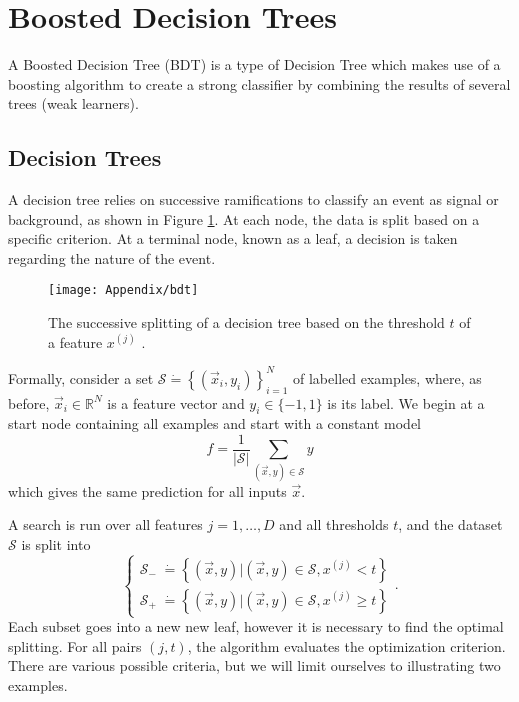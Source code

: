 \documentclass[10pt,a4paper]{book}
\begin{document}
\section{Boosted Decision Trees}
A Boosted Decision Tree (BDT) is a type of Decision Tree which makes use of a boosting algorithm to create a strong classifier by combining the results of several trees (weak learners). 

\subsection{Decision Trees}
A decision tree relies on successive ramifications to classify an event as signal or background, as shown in Figure \ref{tree}. At each node, the data is split based on a specific criterion. At a terminal node, known as a leaf, a decision is taken regarding the nature of the event.

\begin{figure}
\centering
\texttt{[image: Appendix/bdt]}
\caption{The successive splitting of a decision tree based on the threshold $t$ of a feature $x^{(j)}$ \cite{tree_image}.}
\label{tree}
\end{figure}

Formally, consider a set $\mathcal{S} \dot{=} \left\lbrace (\vec{x}_i, y_i) \right\rbrace_{i = 1}^N$ of labelled examples, where, as before, $\vec{x}_i \in \mathbb{R}^N$ is a feature vector and $y_i \in \lbrace -1, 1 \rbrace$ is its label. We begin at a start node containing all examples and start with a constant model
\begin{equation}
f = \frac{1}{\vert \mathcal{S} \vert} \sum_{(\vec{x},y) \in \mathcal{S}} y
\end{equation}
which gives the same prediction for all inputs $\vec{x}$.

A search is run over all features $j = 1, \dots, D$ and all thresholds $t$, and the dataset $\mathcal{S}$ is split into
\begin{equation}
\begin{cases}
\mathcal{S}_{-} \; \dot{=} \left\lbrace (\vec{x},y) \vert (\vec{x},y) \in \mathcal{S}, x^{(j)} < t \right\rbrace \\
\mathcal{S}_{+} \; \dot{=} \left\lbrace (\vec{x},y) \vert (\vec{x},y) \in \mathcal{S}, x^{(j)} \geq t \right\rbrace
\end{cases}.
\end{equation}
Each subset goes into a new new leaf, however it is necessary to find the optimal splitting. For all pairs $(j, t)$, the algorithm evaluates the optimization criterion. There are various possible criteria, but we will limit ourselves to illustrating two examples.
\end{document}

